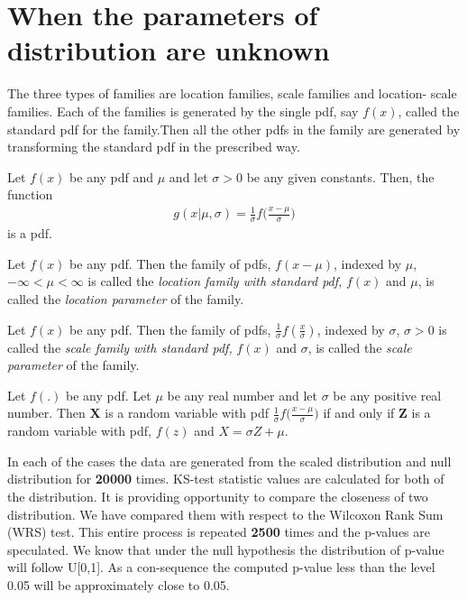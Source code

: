 \documentclass[12pt, reqno]{amsart}
\begin{document}
\section{\textbf{When the parameters of distribution are unknown}}
 
 The three types of families are location families, scale families and location- scale families. Each of the families is generated by the single pdf, say $f(x)$, called the standard pdf for the family.Then all the other pdfs in the family are generated by transforming the standard pdf in the prescribed way.
 
 Let $f(x)$ be any pdf and $\mu$ and let $\sigma > 0$ be any given constants. Then, the function
 \begin{align}
     g(x|\mu,\sigma) = \frac{1}{\sigma} f\bigg(\frac{x-\mu}{\sigma}\bigg)
 \end{align}
 is a pdf.
 \newline
 
 Let $f(x)$ be any pdf. Then the family of pdfs, $f(x-\mu)$, indexed by $\mu$, $-\infty<\mu<\infty$ is called the \textit{location family with standard pdf,} $f(x)$ and $\mu$, is called the \textit{location parameter} of the family.
 
  Let $f(x)$ be any pdf. Then the family of pdfs, $\frac{1}{\sigma}f(\frac{x}{\sigma})$, indexed by $\sigma$, $\sigma>0$ is called the \textit{scale family with standard pdf,} $f(x)$ and $\sigma$, is called the \textit{scale parameter} of the family.
 
  Let $f(.)$ be any pdf. Let $\mu$ be any real number and let $\sigma$ be any positive real number. Then \textbf{X} is a random variable with pdf $\frac{1}{\sigma} f\bigg(\frac{x-\mu}{\sigma}\bigg)$ if and only if \textbf{Z} is a random variable with pdf, $f(z)$ and $X=\sigma Z+\mu$.
  \newline
  
 In each of the cases the data are generated from the scaled distribution and null distribution for \textbf{20000} times.
 KS-test statistic values are calculated for both of the distribution. It is providing opportunity to compare the closeness of two distribution. We have compared them with respect to the Wilcoxon Rank Sum (WRS) test. This entire process is repeated \textbf{2500} times and the p-values are speculated. We know that under the null hypothesis the distribution of p-value will follow U[0,1]. As a con-sequence the computed p-value less than the level 0.05 will be approximately close to 0.05.
 
\end{document}
